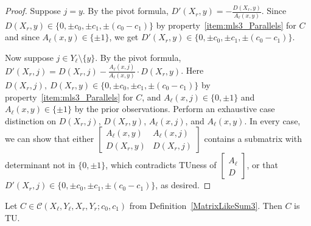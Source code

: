 \begin{proof}
    Suppose $j = y$. By the pivot formula, $D' (X_{r}, y) = -\frac{D (X_{r}, y)}{A_{\ell} (x, y)}$. Since $D (X_{r}, y) \in \{0, \pm c_{0}, \pm c_{1}, \pm (c_{0} - c_{1})\}$ by property~\ref{item:mls3_Parallels} for $C$ and since $A_{\ell} (x, y) \in \{\pm 1\}$, we get $D' (X_{r}, y) \in \{0, \pm c_{0}, \pm c_{1}, \pm (c_{0} - c_{1})\}$.

    Now suppose $j \in Y_{\ell} \setminus \{y\}$. By the pivot formula, $D' (X_{r}, j) = D (X_{r}, j) - \frac{A_{\ell} (x, j)}{A_{\ell} (x, y)} \cdot D (X_{r}, y)$. Here $D (X_{r}, j), \ D (X_{r}, y) \in \{0, \pm c_{0}, \pm c_{1}, \pm (c_{0} - c_{1})\}$ by property~\ref{item:mls3_Parallels} for $C$, and $A_{\ell} (x, j) \in \{0, \pm 1\}$ and $A_{\ell} (x, y) \in \{\pm 1\}$ by the prior observations. Perform an exhaustive case distinction on $D (X_{r}, j)$, $D (X_{r}, y)$, $A_{\ell} (x, j)$, and $A_{\ell} (x, y)$. In every case, we can show that either $\begin{bmatrix} A_{\ell} (x, y) & A_{\ell} (x, j) \\ D (X_{r}, y) & D (X_{r}, j) \end{bmatrix}$ contains a submatrix with determinant not in $\{0, \pm 1\}$, which contradicts TUness of $\begin{bmatrix} A_{\ell} \\ D \end{bmatrix}$, or that $D' (X_{r}, j) \in \{0, \pm c_{0}, \pm c_{1}, \pm (c_{0} - c_{1})\}$, as desired. 
\end{proof}

\begin{lemma}
    \label{MatrixLikeSum3.IsTotallyUnimodular}
    \leanok
    Let $C \in \mathcal{C} (X_{\ell}, Y_{\ell}, X_{r}, Y_{r}; c_{0}, c_{1})$ from Definition~\ref{MatrixLikeSum3}. Then $C$ is TU.
\end{lemma}

